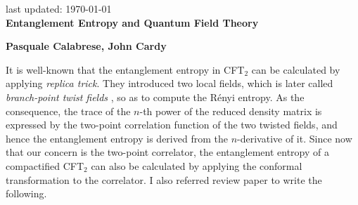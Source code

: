 \documentclass[12pt]{article}
\date{}
\renewcommand{\thefootnote}{\fnsymbol{footnote}}
\begin{document}
{\Large{}
\hfill{\normalsize last updated: \today}
\\[2mm]
\textbf{Entanglement Entropy and Quantum Field Theory\cite{Calabrese:2004eu}
}
}

\noindent
\hfill
\textbf{Pasquale Calabrese, John Cardy}%

\renewcommand{\thefootnote}{\arabic{footnote})}
\setcounter{footnote}{0}
\vspace{12pt}
It is well-known that the entanglement entropy in CFT$_2$ can be calculated by applying \textit{replica trick}.
They introduced two local fields, which is later called \textit{branch-point twist fields} \cite{Cardy:2007mb}, so as to compute the R\' enyi entropy.
As the consequence, the trace of the $n$-th power of the reduced density matrix is expressed by the two-point correlation function of the two twisted fields, and hence the entanglement entropy is derived from the $n$-derivative of it.
Since now that our concern is the two-point correlator, the entanglement entropy of a compactified CFT$_2$ can also be calculated by applying the conformal transformation to the correlator.
I also referred review paper \cite{Calabrese:2009qy} to write the following.
\end{document}
